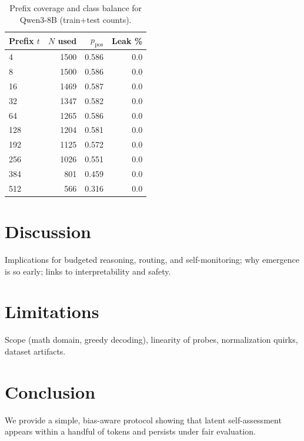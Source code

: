 \documentclass[10pt,a4paper,twocolumn]{article}
\begin{document}
\begin{table}[t]
  \centering
  \caption{Prefix coverage and class balance for Qwen3-8B (train+test counts).}
  \begin{tabular}{lrrr}
  \toprule
  Prefix $t$ & $N$ used & $p_{\text{pos}}$ & Leak \% \\
  \midrule
  4   & 1500 & 0.586 & 0.0 \\
  8   & 1500 & 0.586 & 0.0 \\
  16  & 1469 & 0.587 & 0.0 \\
  32  & 1347 & 0.582 & 0.0 \\
  64  & 1265 & 0.586 & 0.0 \\
  128 & 1204 & 0.581 & 0.0 \\
  192 & 1125 & 0.572 & 0.0 \\
  256 & 1026 & 0.551 & 0.0 \\
  384 & 801  & 0.459 & 0.0 \\
  512 & 566  & 0.316 & 0.0 \\
  \bottomrule
  \end{tabular}
  \label{tab:stats}
\end{table}

\section{Discussion}
\label{sec:discussion}
Implications for budgeted reasoning, routing, and self-monitoring; why emergence is so early; links to interpretability and safety.

\section{Limitations}
\label{sec:limitations}
Scope (math domain, greedy decoding), linearity of probes, normalization quirks, dataset artifacts.

\section{Conclusion}
\label{sec:conclusion}
We provide a simple, bias-aware protocol showing that latent self-assessment appears within a handful of tokens and persists under fair evaluation.
\end{document}
